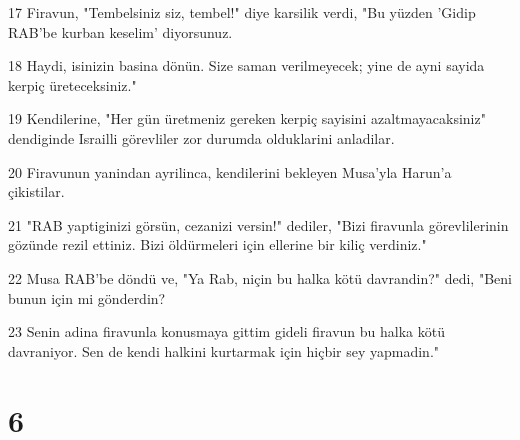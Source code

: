 \par 17 Firavun, "Tembelsiniz siz, tembel!" diye karsilik verdi, "Bu yüzden 'Gidip RAB'be kurban keselim' diyorsunuz.
\par 18 Haydi, isinizin basina dönün. Size saman verilmeyecek; yine de ayni sayida kerpiç üreteceksiniz."
\par 19 Kendilerine, "Her gün üretmeniz gereken kerpiç sayisini azaltmayacaksiniz" dendiginde Israilli görevliler zor durumda olduklarini anladilar.
\par 20 Firavunun yanindan ayrilinca, kendilerini bekleyen Musa'yla Harun'a çikistilar.
\par 21 "RAB yaptiginizi görsün, cezanizi versin!" dediler, "Bizi firavunla görevlilerinin gözünde rezil ettiniz. Bizi öldürmeleri için ellerine bir kiliç verdiniz."
\par 22 Musa RAB'be döndü ve, "Ya Rab, niçin bu halka kötü davrandin?" dedi, "Beni bunun için mi gönderdin?
\par 23 Senin adina firavunla konusmaya gittim gideli firavun bu halka kötü davraniyor. Sen de kendi halkini kurtarmak için hiçbir sey yapmadin."

\chapter{6}

